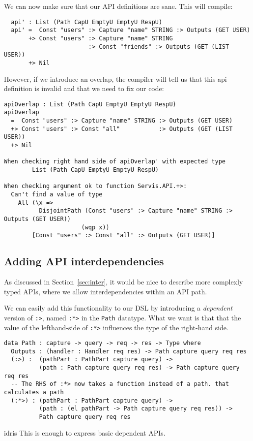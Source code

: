 \documentclass[12pt,a4paper]{article}
\begin{document}
We can now make sure that our API definitions are sane. This will compile:
\begin{verbatim}
  api' : List (Path CapU EmptyU EmptyU RespU)
  api' =  Const "users" :> Capture "name" STRING :> Outputs (GET USER)
       +> Const "users" :> Capture "name" STRING
                        :> Const "friends" :> Outputs (GET (LIST USER))
       +> Nil
\end{verbatim}

However, if we introduce an overlap, the compiler will tell us that this
api definition is invalid and that we need to fix our code:
\begin{verbatim}
apiOverlap : List (Path CapU EmptyU EmptyU RespU)
apiOverlap
  =  Const "users" :> Capture "name" STRING :> Outputs (GET USER)
  +> Const "users" :> Const "all"           :> Outputs (GET (LIST USER))
  +> Nil

When checking right hand side of apiOverlap' with expected type
        List (Path CapU EmptyU EmptyU RespU)

When checking argument ok to function Servis.API.+>:
  Can't find a value of type 
    All (\x =>
          DisjointPath (Const "users" :> Capture "name" STRING :> Outputs (GET USER))
                      (wqp x))
        [Const "users" :> Const "all" :> Outputs (GET USER)]
\end{verbatim}


\subsection{Adding API interdependencies}
As discussed in Section~\ref{sec:inter}, it would be nice to describe more complexly typed APIs, where we allow interdependencies within an API path.

We can easily add this functionality to our DSL by introducing a \emph{dependent} version of \texttt{:>}, named
\texttt{:*>} in the \texttt{Path} datatype.
What we want is that that the value of the lefthand-side of \texttt{:*>} influences the type of the right-hand side.
\begin{verbatim}
data Path : capture -> query -> req -> res -> Type where
  Outputs : (handler : Handler req res) -> Path capture query req res
  (:>) :  (pathPart : PathPart capture query) ->
          (path : Path capture query req res) -> Path capture query req res
  -- The RHS of :*> now takes a function instead of a path. that calculates a path
  (:*>) : (pathPart : PathPart capture query) ->
          (path : (el pathPart -> Path capture query req res)) ->
          Path capture query req res
\end{verbatim}{idris}
This is enough to express basic dependent APIs.
\end{document}
